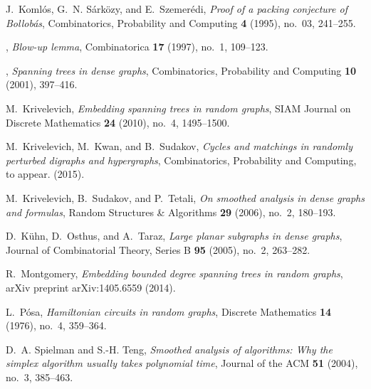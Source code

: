 \documentclass[11pt,english]{article}
\theoremstyle{plain}
\theoremstyle{plain}
\theoremstyle{plain}
\theoremstyle{plain}
\theoremstyle{plain}
\theoremstyle{definition}
\theoremstyle{definition}
\theoremstyle{remark}
\theoremstyle{remark}
\theoremstyle{plain}
\theoremstyle{definition}
\theoremstyle{definition}
\theoremstyle{plain}
\theoremstyle{plain}
\theoremstyle{plain}
\theoremstyle{plain}
\theoremstyle{remark}
\theoremstyle{plain}
\theoremstyle{definition}
\begin{document}
\begin{thebibliography}{10}
J.~Koml{\'o}s, G.~N. S{\'a}rk{\"o}zy, and E.~Szemer{\'e}di, \emph{Proof of a
  packing conjecture of {B}ollob{\'a}s}, Combinatorics, Probability and
  Computing \textbf{4} (1995), no.~03, 241--255.

\bysame, \emph{Blow-up lemma}, Combinatorica \textbf{17} (1997), no.~1,
  109--123.

\bysame, \emph{Spanning trees in dense graphs}, Combinatorics, Probability and
  Computing \textbf{10} (2001), 397--416.

M.~Krivelevich, \emph{Embedding spanning trees in random graphs}, SIAM Journal
  on Discrete Mathematics \textbf{24} (2010), no.~4, 1495--1500.

M.~Krivelevich, M.~Kwan, and B.~Sudakov, \emph{Cycles and matchings in randomly
  perturbed digraphs and hypergraphs}, Combinatorics, Probability and
  Computing, to appear. (2015).

M.~Krivelevich, B.~Sudakov, and P.~Tetali, \emph{On smoothed analysis in dense
  graphs and formulas}, Random Structures \& Algorithms \textbf{29} (2006),
  no.~2, 180--193.

D.~K{\"u}hn, D.~Osthus, and A.~Taraz, \emph{Large planar subgraphs in dense
  graphs}, Journal of Combinatorial Theory, Series B \textbf{95} (2005), no.~2,
  263--282.

R.~Montgomery, \emph{Embedding bounded degree spanning trees in random graphs},
  arXiv preprint arXiv:1405.6559 (2014).

L.~P{\'o}sa, \emph{{H}amiltonian circuits in random graphs}, Discrete
  Mathematics \textbf{14} (1976), no.~4, 359--364.

D.~A. Spielman and S.-H. Teng, \emph{Smoothed analysis of algorithms: Why the
  simplex algorithm usually takes polynomial time}, Journal of the ACM
  \textbf{51} (2004), no.~3, 385--463.

\end{thebibliography}
\end{document}
